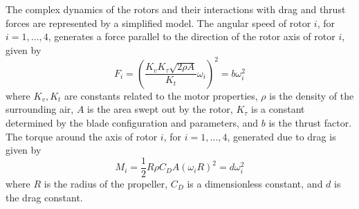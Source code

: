 %

The complex dynamics of the rotors and their interactions with drag and thrust forces are represented by a simplified model. 
The angular speed  of rotor $ i $, for $ i=1,\dots,4 $, generates a force  parallel to the direction of the rotor axis of rotor $ i $, given by
\begin{equation}\label{key}
F_i=\left( \frac{K_vK_\tau\sqrt{2\rho A}}{K_t}\omega_i\right)^2=b\omega_i^2 
\end{equation}
where $ K_v,K_t $ are constants related to the motor properties, $ \rho $ is the density of the surrounding air, $ A $ is the area swept out by the rotor, $ K_\tau $ is a constant determined by the blade configuration and parameters, and $ b $ is the thrust factor.\\
The torque around the axis of rotor $ i $, for $ i=1,\dots,4 $, generated due to drag is given by
\begin{equation}\label{key}
M_{i}=\frac{1}{2}R\rho C_DA(\omega_iR)^2=d\omega_i^2
\end{equation}
where $ R $ is the radius of the propeller, $ C_D $ is a dimensionless constant, and $ d $ is the drag constant.

